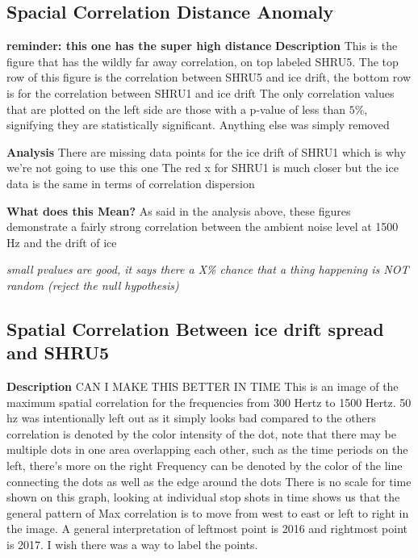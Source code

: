 \subsection{Spacial Correlation Distance Anomaly}
\textbf{reminder: this one has the super high distance}
\textbf{Description}
This is the figure that has the wildly far away correlation, on top labeled SHRU5. 
The top row of this figure is the correlation between SHRU5 and ice drift, the bottom row is for the correlation between SHRU1 and ice drift
The only correlation values that are plotted on the left side are those with a p-value of less than {$5\%$}, signifying they are statistically significant. Anything else was simply removed 

\textbf{Analysis}
There are missing data points for the ice drift of SHRU1 which is why we’re not going to use this one
The red x for SHRU1 is much closer but the ice data is the same in terms of correlation dispersion

\textbf{What does this Mean?}
As said in the analysis above, these figures demonstrate a fairly strong correlation between the ambient noise level at 1500 Hz and the drift of ice

\textit{small pvalues are good, it says there a X\% chance that a thing happening is NOT random (reject the null hypothesis)}

\subsection{Spatial Correlation Between ice drift spread and SHRU5}

\textbf{Description}
CAN I MAKE THIS BETTER IN TIME
This is an image of the  maximum spatial correlation for the frequencies from 300 Hertz to 1500 Hertz. 50 hz was intentionally left out as it simply looks bad compared to the others
correlation is denoted by the color intensity of the dot, note that there may be multiple dots in one area overlapping each other, such as the time periods on the left, there's more on the right
Frequency can be denoted by the color of the line connecting the dots as well as the edge around the dots
There is no scale for time shown on this graph, looking at individual stop shots in time shows us that the general pattern of Max correlation is to move from west to east or left to right in the image. A general interpretation of leftmost point is 2016 and rightmost point is 2017. I wish there was a way to label the points.  

